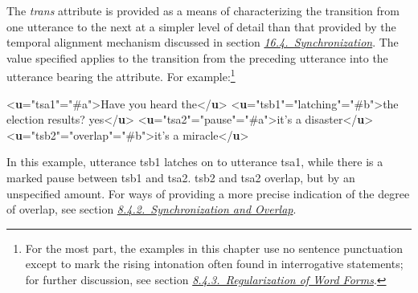 The {\itshape trans} attribute is provided as a means of characterizing the transition from one utterance to the next at a simpler level of detail than that provided by the temporal alignment mechanism discussed in section \textit{\hyperref[SASY]{16.4.\ Synchronization}}. The value specified applies to the transition from the preceding utterance into the utterance bearing the attribute. For example:\footnote{For the most part, the examples in this chapter use no sentence punctuation except to mark the rising intonation often found in interrogative statements; for further discussion, see section \textit{\hyperref[TSREG]{8.4.3.\ Regularization of Word Forms}}.} \par\bgroup{}\exampleFont \begin{shaded}\noindent\mbox{}{<\textbf{u}\hspace*{1em}{xml:id}="{ts\textunderscore a1}"\hspace*{1em}{who}="{\#a}">}Have you heard the{</\textbf{u}>}\mbox{}\newline 
{<\textbf{u}\hspace*{1em}{xml:id}="{ts\textunderscore b1}"\hspace*{1em}{trans}="{latching}"\hspace*{1em}{who}="{\#b}">}the election results? yes{</\textbf{u}>}\mbox{}\newline 
{<\textbf{u}\hspace*{1em}{xml:id}="{ts\textunderscore a2}"\hspace*{1em}{trans}="{pause}"\hspace*{1em}{who}="{\#a}">}it's a disaster{</\textbf{u}>}\mbox{}\newline 
{<\textbf{u}\hspace*{1em}{xml:id}="{ts\textunderscore b2}"\hspace*{1em}{trans}="{overlap}"\hspace*{1em}{who}="{\#b}">}it's a miracle{</\textbf{u}>}\end{shaded}\egroup\par \noindent  In this example, utterance ts\textunderscore b1 latches on to utterance ts\textunderscore a1, while there is a marked pause between ts\textunderscore b1 and ts\textunderscore a2. ts\textunderscore b2 and ts\textunderscore a2 overlap, but by an unspecified amount. For ways of providing a more precise indication of the degree of overlap, see section \textit{\hyperref[TSSAPA]{8.4.2.\ Synchronization and Overlap}}.\par
